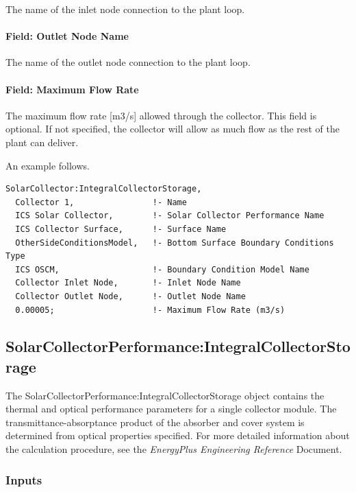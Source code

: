 The name of the inlet node connection to the plant loop.

\paragraph{Field: Outlet Node Name}\label{field-outlet-node-name-1-005}

The name of the outlet node connection to the plant loop.

\paragraph{Field: Maximum Flow Rate}\label{field-maximum-flow-rate-1-000}

The maximum flow rate {[}m3/s{]} allowed through the collector. This field is optional. If not specified, the collector will allow as much flow as the rest of the plant can deliver.

An example follows.

\begin{lstlisting}
SolarCollector:IntegralCollectorStorage,
  Collector 1,                !- Name
  ICS Solar Collector,        !- Solar Collector Performance Name
  ICS Collector Surface,      !- Surface Name
  OtherSideConditionsModel,   !- Bottom Surface Boundary Conditions Type
  ICS OSCM,                   !- Boundary Condition Model Name
  Collector Inlet Node,       !- Inlet Node Name
  Collector Outlet Node,      !- Outlet Node Name
  0.00005;                    !- Maximum Flow Rate (m3/s)
\end{lstlisting}

\subsection{SolarCollectorPerformance:IntegralCollectorStorage}\label{solarcollectorperformanceintegralcollectorstorage}

The SolarCollectorPerformance:IntegralCollectorStorage object contains the thermal and optical performance parameters for a single collector module. The transmittance-absorptance product of the absorber and cover system is determined from optical properties specified. For more detailed information about the calculation procedure, see the \emph{EnergyPlus Engineering Reference} Document.

\subsubsection{Inputs}\label{inputs-3-035}

